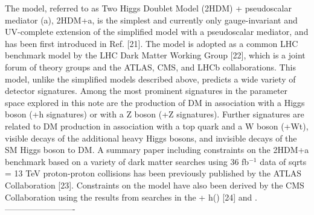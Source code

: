 The model, referred to as Two Higgs Doublet Model (2HDM) + pseudoscalar mediator (a), 2HDM+a, is
the simplest and currently only gauge-invariant and UV-complete extension of the simplified model with a
pseudoscalar mediator, and has been first introduced in Ref. [21]. The model is adopted as a common LHC
benchmark model by the LHC Dark Matter Working Group [22], which is a joint forum of theory groups
and the ATLAS, CMS, and LHCb collaborations. This model, unlike the simplified models described above,
predicts a wide variety of detector signatures. Among the most prominent signatures in the parameter space
explored in this note are the production of DM in association with a Higgs boson (\MET+h signatures) or
with a Z boson (\MET+Z signatures). Further signatures are related to DM production in association with
a top quark and a W boson (\MET+Wt), visible decays of the additional heavy Higgs bosons, and invisible
decays of the SM Higgs boson to DM.
A summary paper including constraints on the 2HDM+a benchmark based on a variety of dark matter
searches using 36 fb$^{-1}$ data of sqrts = 13 TeV proton-proton collisions has been previously published by the
ATLAS Collaboration [23]. Constraints on the model have also been derived by the CMS Collaboration
using the results from searches in the \MET+ h(\bbar) [24] and \MET.
-------------------------